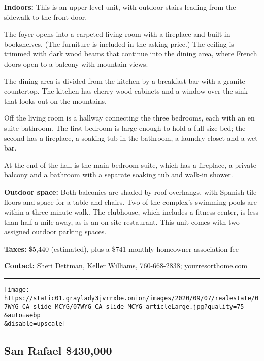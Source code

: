 \textbf{Indoors:} This is an upper-level unit, with outdoor stairs
leading from the sidewalk to the front door.

The foyer opens into a carpeted living room with a fireplace and
built-in bookshelves. (The furniture is included in the asking price.)
The ceiling is trimmed with dark wood beams that continue into the
dining area, where French doors open to a balcony with mountain views.

The dining area is divided from the kitchen by a breakfast bar with a
granite countertop. The kitchen has cherry-wood cabinets and a window
over the sink that looks out on the mountains.

Off the living room is a hallway connecting the three bedrooms, each
with an en suite bathroom. The first bedroom is large enough to hold a
full-size bed; the second has a fireplace, a soaking tub in the
bathroom, a laundry closet and a wet bar.

At the end of the hall is the main bedroom suite, which has a fireplace,
a private balcony and a bathroom with a separate soaking tub and walk-in
shower.

\textbf{Outdoor space:} Both balconies are shaded by roof overhangs,
with Spanish-tile floors and space for a table and chairs. Two of the
complex's swimming pools are within a three-minute walk. The clubhouse,
which includes a fitness center, is less than half a mile away, as is an
on-site restaurant. This unit comes with two assigned outdoor parking
spaces.

\textbf{Taxes:} \$5,440 (estimated), plus a \$741 monthly homeowner
association fee

\textbf{Contact:} Sheri Dettman, Keller Williams, 760-668-2838;
\href{https://yourresorthome.com/featured-condos/77781-tradition-dr-la-quinta}{yourresorthome.com}

\begin{center}\rule{0.5\linewidth}{\linethickness}\end{center}

\texttt{[image: https://static01.graylady3jvrrxbe.onion/images/2020/09/07/realestate/07WYG-CA-slide-MCYG/07WYG-CA-slide-MCYG-articleLarge.jpg?quality=75\\\&auto=webp\\\&disable=upscale]}

\hypertarget{san-rafael--430000}{%
\subsection{San Rafael \textbar{} \$430,000}\label{san-rafael--430000}}

